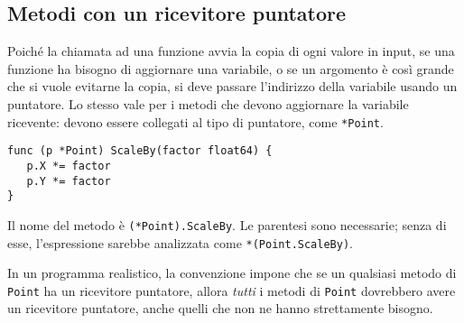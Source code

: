 \documentclass[../../thesis.tex]{subfiles}
\begin{document}
    \subsection{Metodi con un ricevitore puntatore}\label{subsec:metodi-con-un-ricevitore-puntatore}
    Poiché la chiamata ad una funzione avvia la copia di ogni valore in input, se una funzione ha bisogno di aggiornare una variabile, o se un argomento è così grande che si vuole evitarne la copia, si deve passare l'indirizzo della variabile usando un puntatore.
    Lo stesso vale per i metodi che devono aggiornare la variabile ricevente: devono essere collegati al tipo di puntatore, come \verb"*Point".
    \begin{lstlisting}[frame = single, label = {lst:lstlisting5-2.1}]
func (p *Point) ScaleBy(factor float64) {
   p.X *= factor
   p.Y *= factor
}
    \end{lstlisting}
    Il nome del metodo è \verb"(*Point).ScaleBy".
    Le parentesi sono necessarie;
    senza di esse, l'espressione sarebbe analizzata come \verb"*(Point.ScaleBy)".
    \hfill \vspace{12pt}

    In un programma realistico, la convenzione impone che se un qualsiasi metodo di \verb"Point" ha un ricevitore puntatore, allora \textit{tutti} i metodi di \verb"Point" dovrebbero avere un ricevitore puntatore, anche quelli che non ne hanno strettamente bisogno.
    \hfill \vspace{12pt}
\end{document}
